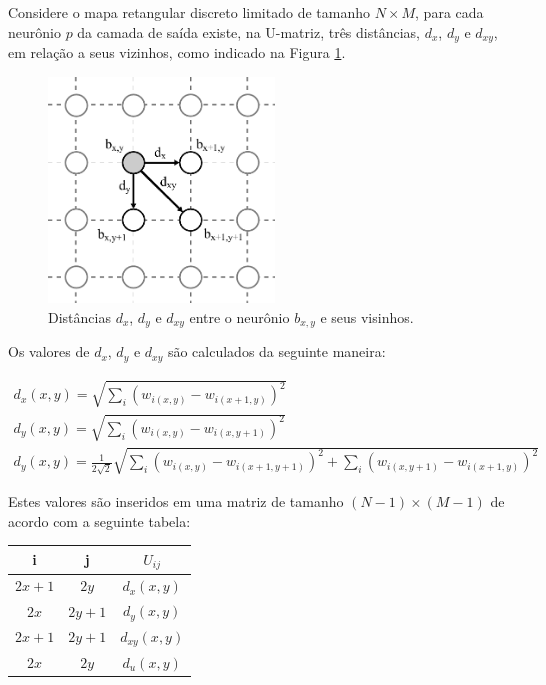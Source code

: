 Considere o mapa retangular discreto limitado de tamanho $ N \times M $, para cada
neurônio $ p $ da camada de saída existe, na U-matriz, três distâncias, $ d_x $,
$ d_y $ e  $ d_{xy} $, em relação a seus vizinhos, como indicado na Figura \ref{fig:dxdydxy}.

\begin{figure}[H]
  \begin{center}
    \includegraphics[height=6cm]{imagens/dxdydxy.pdf}
  \end{center}
  \caption{ Distâncias $ d_x $, $ d_y $ e $ d_{xy} $ entre o neurônio $ b_{x,y} $
    e seus visinhos. }
  \label{fig:dxdydxy}
\end{figure}

Os valores de $ d_x $, $ d_y $ e $ d_{xy} $ são calculados da seguinte maneira:

\begin{subequations}\label{eq:dxdydxy}
\begin{align}
  d_x(x, y) = \sqrt{\sum_i{ \left( w_{i(x,y)} - w_{i(x + 1, y)} \right)^2 }}\\
  d_y(x, y) = \sqrt{\sum_i{ \left( w_{i(x,y)} - w_{i(x, y + 1)} \right)^2 }}\\
  d_y(x, y) = \frac{1}{2\sqrt{2}}\sqrt{\sum_i{ \left( w_{i(x,y)} - w_{i(x + 1, y + 1)} \right)^2 } + \sum_i{ \left( w_{i(x,y + 1)} - w_{i(x + 1, y)} \right)^2 } }
\end{align}
\end{subequations}

Estes valores são inseridos em uma matriz de tamanho $ (N-1) \times (M-1) $ de acordo
com a seguinte tabela:

\begin{center}
\begin{tabular}{|c|c|c|}
\hline
  \textbf{i} & \textbf{j} & \textbf{$ U_{ij} $} \\
\hline
\hline
  $ 2x + 1 $ &     $ 2y $ & $ d_x(x,y) $    \\
\hline
      $ 2x $ & $ 2y + 1 $ & $ d_y(x,y) $    \\
\hline
  $ 2x + 1 $ & $ 2y + 1 $ & $ d_{xy}(x,y) $ \\
\hline
      $ 2x $ &     $ 2y $ & $ d_u(x,y) $    \\
\hline
\end{tabular}
\end{center}

